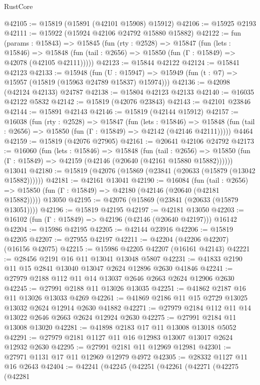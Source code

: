 \begin{lexlean}{RustCore}
\begin{coremodule}
@42105 := @15819 (@15891 (@42101 @15908) @15912)
@42106 := @15925 @2193
@42111 := @15922 (@15924 @42106 @24792 @15880 @15882)
@42122 := fun (params : @15843) =>
  @15845
    (fun (rty : @2528) =>
    @15847
      (fun (lets : @15846) =>
      @15848 (fun (tail : @2656) => @15850 (fun (Γ : @15849) => @42078 (@42105 @42111)))))
@42123 := @15844 @42122
@42124 := @15841 @42123
@42133 := @15948
    (fun (U : @15947) => @15949 (fun (t : @7) => @15957 (@15819 (@15963 @24789 @15837) @15974)))
@42136 := @42098 (@42124 @42133) @24787
@42138 := @15804 @42123 @42133
@42140 := @16035 @42122 @5832
@42142 := @15819 (@42076 @23843)
@42143 := @42101 @23846
@42144 := @15891 @42143
@42146 := @15819 (@42144 @15912)
@42157 := @16038
    (fun (rty : @2528) =>
    @15847
      (fun (lets : @15846) =>
      @15848 (fun (tail : @2656) => @15850 (fun (Γ : @15849) => @42142 (@42146 @42111)))))
    @4464
@42159 := @15819 (@42076 @27905)
@42161 := @20641 @42106 @24792
@42173 := @16060
    (fun (lets : @15846) =>
    @15848
      (fun (tail : @2656) =>
      @15850 (fun (Γ : @15849) => @42159 (@42146 (@20640 (@42161 @15880 @15882))))))
    @13041
@42180 := @15819 (@42076 (@15869 (@23841 (@20633 (@15879 (@13042 @15882))))))
@42181 := @42161 @13041
@42190 := @16084
    (fun (tail : @2656) => @15850 (fun (Γ : @15849) => @42180 (@42146 (@20640 (@42181 @15882)))))
    @13050
@42195 := @42076 (@15869 (@23841 (@20633 (@15879 @13051))))
@42196 := @15819 @42195
@42197 := @42181 @13050
@42203 := @16102 (fun (Γ : @15849) => @42196 (@42146 (@20640 @42197))) @16142
@42204 := @15986 @42195
@42205 := @42144 @23916
@42206 := @15819 @42205
@42207 := @27955 @42197
@42211 := @42204 (@42206 @42207) (@16156 @42075)
@42215 := @15986 @42205 @42207 (@16161 @42143)
@42221 := @28456 @2191 @16 @11 @13041 @13048 @5807
@42231 := @41833 @2190 @11 @15 @2841 @13040 @13047 @2624 @12896 @2630 @41846
@42241 := @27979 @2188 @112 @11 @14 @13037 @2646 @2663 @2624 @12906 @2630
@42245 := @27991 @2188 @11 @13026 @13035
@42251 := @41862 @2187 @16 @11 @13026 @13033 @4269
@42261 := @41869 @2186 @11 @15 @2729 @13025 @13032 @2624 @12914 @2630 @41882
@42271 := @27979 @2184 @112 @11 @14 @13022 @2646 @2663 @2624 @12924 @2630
@42275 := @27991 @2184 @11 @13008 @13020
@42281 := @41898 @2183 @17 @11 @13008 @13018 @5052
@42291 := @27979 @2181 @1127 @11 @16 @12983 @13007 @13017 @2624 @12932 @2630
@42295 := @27991 @2181 @11 @12969 @12981
@42301 := @27971 @1131 @17 @11 @12969 @12979 @4972
@42305 := @28332 @1127 @11 @16 @2643
@42404 := @42241
    (@42245
      (@42251
        (@42261
          (@42271
            (@42275
              (@42281

\end{coremodule}
\end{lexlean}
